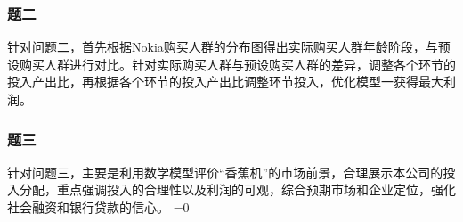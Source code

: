 \documentclass{article}
\begin{document}
\subsubsection{题二}
针对问题二，首先根据Nokia购买人群的分布图得出实际购买人群年龄阶段，与预设购买人群进行对比。针对实际购买人群与预设购买人群的差异，调整各个环节的投入产出比，再根据各个环节的投入产出比调整环节投入，优化模型一获得最大利润。
\subsubsection{题三}
针对问题三，主要是利用数学模型评价“香蕉机”的市场前景，合理展示本公司的投入分配，重点强调投入的合理性以及利润的可观，综合预期市场和企业定位，强化社会融资和银行贷款的信心。
\ifnum{}=0
	
\end{document}
